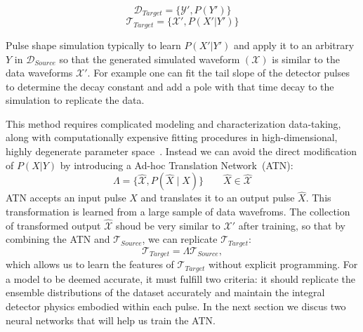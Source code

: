 \begin{equation}
\mathcal{D}_{Target}=\{\mathcal{Y}',P(Y')\}
\end{equation}
\begin{equation}
\mathcal{T}_{Target}=\{\mathcal{X}',P(X'|Y')\}
\end{equation}

Pulse shape simulation typically to learn $P(X'|Y')$ and apply it to an arbitrary $Y$ in $\mathcal{D}_{Source}$ so that the generated simulated waveform $(\mathcal{X})$ is similar to the data waveforms $\mathcal{X}'$. For example one can fit the tail slope of the detector pulses to determine the decay constant and add a pole with that time decay to the simulation to replicate the data. 

This method requires complicated modeling and characterization data-taking, along with computationally expensive fitting procedures in high-dimensional, highly degenerate parameter space~\cite{Ben_Thesis,Sam_Thesis}. Instead we can avoid the direct modification of  $P(X|Y)$ by introducing a Ad-hoc Translation Network~(ATN):
\begin{equation}
\Lambda = \{\hat{\mathcal{X}}, P(\hat{X}\mid X)\}\qquad \hat{X}\in \hat{\mathcal{X}}
\label{eqn:atn}
\end{equation}
ATN accepts an input pulse $X$ and translates it to an output pulse $\hat{X}$. This transformation is learned from a large sample of data wavefroms. The collection of transformed output $\hat{\mathcal{X}}$ shoud be very similar to $\mathcal{X}'$ after training, so that by combining the ATN and $\mathcal{T}_{Source}$, we can replicate $\mathcal{T}_{Target}$:
\begin{equation}
    \mathcal{T}_{Target}=\Lambda \mathcal{T}_{Source} ,
    \label{eqn:atn_task}
\end{equation}
which allows us to learn the features of $\mathcal{T}_{Target}$ without explicit programming. For a model to be deemed accurate, it must fulfill two criteria: it should replicate the ensemble distributions of the dataset accurately and maintain the integral detector physics embodied within each pulse. In the next section we discus two neural networks that will help us train the ATN.



